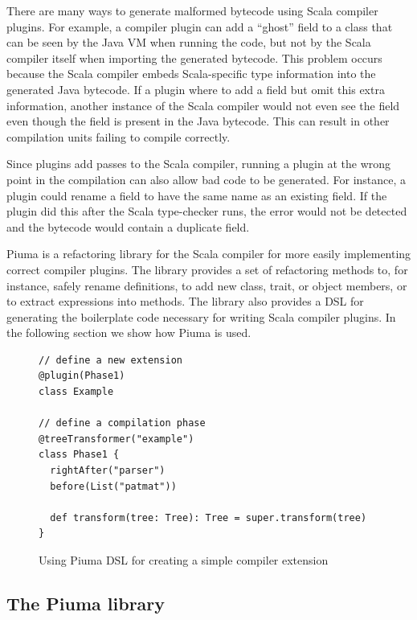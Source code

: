 \documentclass{article}
\begin{document}
There are many ways to generate malformed bytecode using Scala compiler
plugins.  For example, a compiler plugin can add a ``ghost'' field to a class
that can be seen by the Java VM when running the code, but not by the Scala
compiler itself when importing the generated bytecode.  This problem occurs
because the Scala compiler embeds Scala-specific type information into the
generated Java bytecode. If a plugin where to add a field but omit this extra
information, another instance of the Scala compiler would not even see the
field even though the field is present in the Java bytecode. This can result in
other compilation units failing to compile correctly.

Since plugins add passes to the Scala compiler, running a plugin at the wrong
point in the compilation can also allow bad code to be generated.  For
instance, a plugin could rename a field to have the same name as an existing
field. If the plugin did this after the Scala type-checker runs, the error
would not be detected and the bytecode would contain a duplicate field.


Piuma is a refactoring library for the Scala compiler for more easily
implementing correct compiler plugins.  The library  provides a set of
refactoring methods to, for instance, safely rename definitions, to add new
class, trait, or object members, or to extract expressions into methods. The
library also provides a DSL for generating the boilerplate code necessary for
writing Scala compiler plugins. In the following section we show how Piuma
is used.  


\begin{figure}[tp]
\begin{lstlisting}
// define a new extension
@plugin(Phase1)
class Example

// define a compilation phase
@treeTransformer("example")
class Phase1 {
  rightAfter("parser")
  before(List("patmat"))

  def transform(tree: Tree): Tree = super.transform(tree)
}
\end{lstlisting}
\caption{Using Piuma DSL for creating a simple compiler extension}
\label{lst:neveMini} 
\end{figure}


\subsection{The Piuma library}
\end{document}

